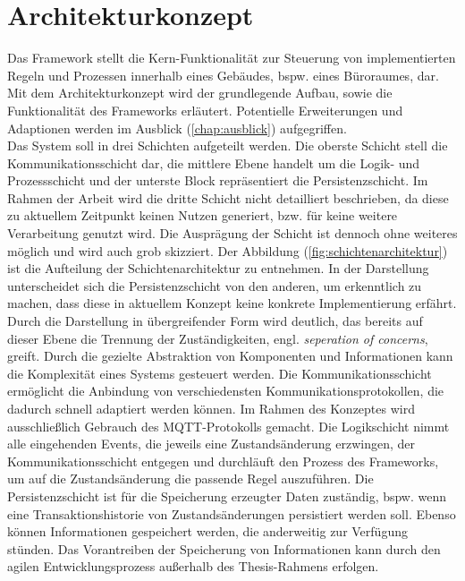 \section{Architekturkonzept}
\label{sec:architekturkonzept}
    Das Framework stellt die Kern-Funktionalität zur Steuerung von implementierten Regeln und Prozessen innerhalb eines 
    Gebäudes, bspw. eines Büroraumes, dar. Mit dem Architekturkonzept wird der grundlegende Aufbau, sowie die Funktionalität des Frameworks erläutert. 
    Potentielle Erweiterungen und Adaptionen werden im Ausblick (\ref{chap:ausblick}) aufgegriffen.
    \\ 
    \linebreak
    Das System soll in drei Schichten aufgeteilt werden. Die oberste Schicht stell die Kommunikationsschicht dar, die mittlere Ebene 
    handelt um die Logik- und Prozessschicht und der unterste Block repräsentiert die Persistenzschicht. Im Rahmen der Arbeit wird 
    die dritte Schicht nicht detailliert beschrieben, da diese zu aktuellem Zeitpunkt keinen Nutzen generiert, bzw. für keine weitere Verarbeitung 
    genutzt wird. Die Ausprägung der Schicht ist dennoch ohne weiteres möglich und wird auch grob skizziert. Der Abbildung 
    (\ref{fig:schichtenarchitektur}) ist die Aufteilung der Schichtenarchitektur zu entnehmen. In der Darstellung unterscheidet sich die 
    Persistenzschicht von den anderen, um erkenntlich zu machen, dass diese in aktuellem Konzept keine konkrete Implementierung erfährt. 
    Durch die Darstellung in übergreifender Form wird deutlich, das bereits auf dieser Ebene die Trennung der Zuständigkeiten, engl. 
    \textit{seperation of concerns}, greift. Durch die gezielte Abstraktion von Komponenten und Informationen kann die Komplexität 
    eines Systems gesteuert werden. Die Kommunikationsschicht ermöglicht die Anbindung von verschiedensten Kommunikationsprotokollen, die 
    dadurch schnell adaptiert werden können. Im Rahmen des Konzeptes wird ausschließlich Gebrauch des \acs{MQTT}-Protokolls gemacht. 
    Die Logikschicht nimmt alle eingehenden Events, die jeweils eine Zustandsänderung erzwingen, der Kommunikationsschicht entgegen 
    und durchläuft den Prozess des Frameworks, um auf die Zustandsänderung die passende Regel auszuführen. Die 
    Persistenzschicht ist für die Speicherung erzeugter Daten zuständig, bspw. wenn eine Transaktionshistorie von Zustandsänderungen 
    persistiert werden soll. Ebenso können Informationen gespeichert werden, die anderweitig zur Verfügung stünden. Das Vorantreiben der Speicherung 
    von Informationen kann durch den agilen Entwicklungsprozess außerhalb des Thesis-Rahmens erfolgen. 
